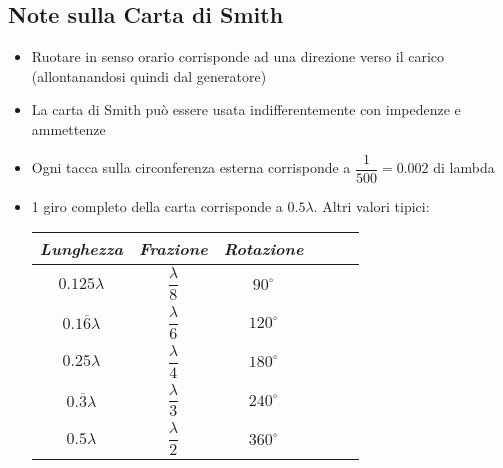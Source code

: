 \documentclass{article}
\begin{document}
\subsection{Note sulla Carta di Smith}
\begin{itemize}
	\item Ruotare in senso orario corrisponde ad una direzione verso il carico (allontanandosi quindi dal generatore)
	\item La carta di Smith può essere usata indifferentemente con impedenze e ammettenze
	\item Ogni tacca sulla circonferenza esterna corrisponde a \( \dfrac{1}{500} = 0.002 \) di lambda
	\item 1 giro completo della carta corrisponde a \(0.5 \lambda\). Altri valori tipici:
	\vspace{5pt}
	\begin{center}
		\begin{tabular}{|Sc|Sc|Sc|}
			\hline 
			\textit{Lunghezza} & \textit{Frazione} & \textit{Rotazione} \\ 
			\hline 	
			\(0.125 \lambda\) & \(\dfrac{\lambda}{8}\) & \(90^\circ\) \\ 
			\hline 
			\(0.1\overline{6} \lambda\) & \(\dfrac{\lambda}{6}\) & \(120^\circ\) \\ 
			\hline 
			\(0.25 \lambda\) & \(\dfrac{\lambda}{4}\) & \(180^\circ\) \\ 
			\hline 
			\(0.\overline{3} \lambda\) & \(\dfrac{\lambda}{3}\) &\(240^\circ\) \\
			\hline
			\(0.5 \lambda\) & \(\dfrac{\lambda}{2}\) & \(360^\circ\) \\ 
			\hline 
		\end{tabular} 
	\end{center}
	\vspace{5pt}
\end{itemize}

\newpage
\end{document}
